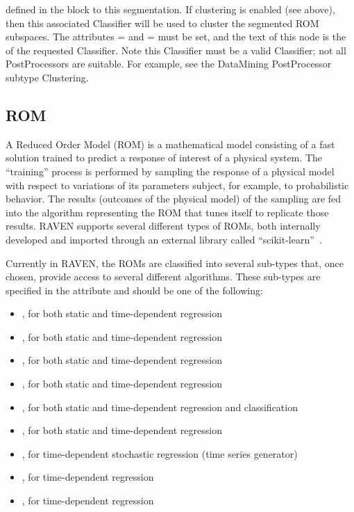 {\begin{itemize}
        defined in the  block to this segmentation. If clustering is enabled (see
         above), then this associated Classifier will be used to cluster the segmented ROM
        subspaces. The attributes = and
        = must be set, and the text of this node is the 
        of the requested Classifier. Note this Classifier must be a valid Classifier; not all PostProcessors
        are suitable. For example, see the DataMining PostProcessor subtype Clustering.
    \end{itemize}
}

\subsection{ROM}
\label{subsec:models_ROM}
A Reduced Order Model (ROM) is a mathematical model consisting of a fast
solution trained to predict a response of interest of a physical system.
%
The ``training'' process is performed by sampling the response of a physical
model with respect to variations of its parameters subject, for example, to
probabilistic behavior.
%
The results (outcomes of the physical model) of the sampling are fed into the
algorithm representing the ROM that tunes itself to replicate those results.
%
RAVEN supports several different types of ROMs, both internally developed and
imported through an external library called ``scikit-learn''~\cite{SciKitLearn}.

Currently in RAVEN, the ROMs are classified into several sub-types that, once chosen,
provide access to several different algorithms.
%
These sub-types are specified in the  attribute and should be
one of the following:
\begin{itemize}
  \item {}, for both static and time-dependent regression
  \item {}, for both static and time-dependent regression
  \item {}, for both static and time-dependent regression
  \item {}, for both static and time-dependent regression
  \item {}, for both static and time-dependent regression and classification
  \item {}, for both static and time-dependent regression
  \item {}, for time-dependent stochastic regression (time series generator)
  \item {}, for time-dependent regression
  \item {}, for time-dependent regression
\end{itemize}

